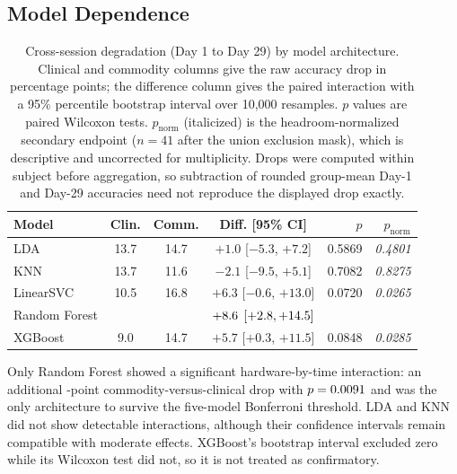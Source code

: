 \documentclass[preprint,12pt]{elsarticle}
\begin{document}
\subsection{Model Dependence}
\begin{table}[htbp]
    \centering
    \small
    \setlength{\tabcolsep}{4pt}
    \caption{Cross-session degradation (Day 1 to Day 29) by model architecture. Clinical and commodity columns give the raw accuracy drop in percentage points; the difference column gives the paired interaction with a 95\% percentile bootstrap interval over 10,000 resamples. $p$ values are paired Wilcoxon tests. $p_{\text{norm}}$ (italicized) is the headroom-normalized secondary endpoint ($n=41$ after the union exclusion mask), which is descriptive and uncorrected for multiplicity. Drops were computed within subject before aggregation, so subtraction of rounded group-mean Day-1 and Day-29 accuracies need not reproduce the displayed drop exactly.}
    \label{tab:model_dependence}
    \begin{tabular}{lcccrr}
        \toprule
        \textbf{Model} & \textbf{Clin.} & \textbf{Comm.} &
        \textbf{Diff. [95\% CI]} & \textbf{$p$} & \textit{$p_{\text{norm}}$} \\
        \midrule
        LDA           & 13.7 & 14.7 & $+1.0$ [$-5.3$, $+7.2$]  & 0.5869 & \textit{0.4801} \\
        KNN           & 13.7 & 11.6 & $-2.1$ [$-9.5$, $+5.1$]  & 0.7082 & \textit{0.8275} \\
        LinearSVC     & 10.5 & 16.8 & $+6.3$ [$-0.6$, $+13.0$] & 0.0720 & \textit{0.0265} \\
        Random Forest & \rfClinDrop{}  & \rfCommDrop{} & $+8.6{}$ $[+2.8, +14.5]{}$ & \rfInteractionP{} & \textit{\rfInteractionNormP{}} \\
        XGBoost       & 9.0  & 14.7 & $+5.7$ [$+0.3$, $+11.5$] & 0.0848 & \textit{0.0285} \\
        \bottomrule
    \end{tabular}
\end{table}

Only Random Forest showed a significant hardware-by-time interaction: an additional \rfInteractionDiff{}-point commodity-versus-clinical drop with $p=0.0091{}$ and was the only architecture to survive the five-model Bonferroni threshold. LDA and KNN did not show detectable interactions, although their confidence intervals remain compatible with moderate effects. XGBoost's bootstrap interval excluded zero while its Wilcoxon test did not, so it is not treated as confirmatory.
\end{document}
